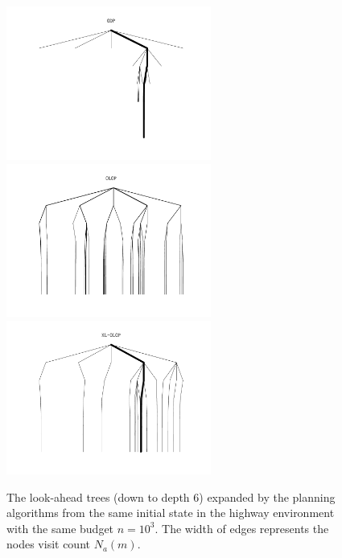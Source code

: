 \begin{figure}[pth]
	\centering
	
	\includegraphics[width=0.6\textwidth]{img/tree_OPD_svg-tex} \includegraphics[width=0.6\textwidth]{img/tree_OLOP_svg-tex}
	\includegraphics[width=0.6\textwidth]{img/tree_KL-OLOP_svg-tex}
	
	\caption{The look-ahead trees (down to depth 6) expanded by the planning algorithms from the same initial state in the highway environment with the same budget $n=10^3$. The width of edges represents the nodes visit count $N_a(m)$.}
	\label{fig:trees}
\end{figure}


